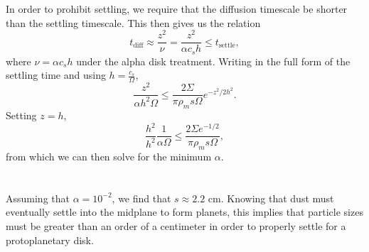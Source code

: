 \documentclass[11pt]{article}
\newenvironment{tight_enumerate}{
    \begin{enumerate}[label=(\alph*)]
    \setlength{\itemsep}{3pt}
    \setlength{\parskip}{0pt}}
    {\end{enumerate}}
\begin{document}
\begin{tight_enumerate}
\item In order to prohibit settling, we require that the diffusion timescale be shorter than the settling timescale. This then gives us the relation 
\[t_\text{diff} \approx \frac{z^2}{\nu} = \frac{z^2}{\alpha c_s h} \leq t_\text{settle},\]
where $\nu = \alpha c_s h$ under the alpha disk treatment. Writing in the full form of the settling time and using $h = \frac{c_s}{\Omega}$, 
\[\frac{z^2}{\alpha h^2\Omega} \leq \frac{2\Sigma}{\pi \rho_m s\Omega}e^{-z^2/2h^2}.\]
Setting $z = h$, 
\[\frac{h^2}{h^2}\frac{1}{\alpha\Omega} \leq \frac{2\Sigma e^{-1/2}}{\pi \rho_m s\Omega},\]
from which we can then solve for the minimum $\alpha$.\\
\\
\\
Assuming that $\alpha = 10^{-2}$, we find that $s \approx 2.2$ \si{\centi\meter}. Knowing that dust must eventually settle into the midplane to form planets, this implies that particle sizes must be greater than an order of a centimeter in order to properly settle for a protoplanetary disk.


\end{tight_enumerate}
\end{document}

